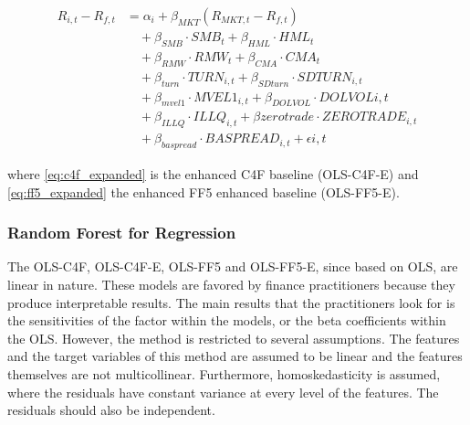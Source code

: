 \begin{equation}
    \label{eq:ff5_expanded}
    \begin{split}
    R_{i,t} - R_{f,t} &= \alpha_i + \beta_{MKT} (R_{MKT,t} - R_{f,t}) \\
    &\quad + \beta_{SMB} \cdot SMB_t + \beta_{HML} \cdot HML_t \\
    &\quad + \beta_{RMW} \cdot RMW_t + \beta_{CMA} \cdot CMA_t\\
    &\quad + \beta_{turn} \cdot TURN_{i,t} + \beta_{SDturn} \cdot SDTURN_{i,t} \\
    &\quad + \beta_{mvel1} \cdot MVEL1_{i,t} + \beta_{DOLVOL} \cdot DOLVOL{i,t} \\
    &\quad + \beta_{ILLQ} \cdot ILLQ_{i,t} + \beta{zerotrade} \cdot ZEROTRADE_{i,t} \\
    &\quad + \beta_{baspread} \cdot BASPREAD_{i,t} + \epsilon{i,t}
    \end{split}
\end{equation}

where \cref{eq:c4f_expanded} is the enhanced C4F baseline (OLS-C4F-E) and \cref{eq:ff5_expanded} the enhanced FF5 enhanced baseline (OLS-FF5-E).



\subsubsection{Random Forest for Regression}



The OLS-C4F, OLS-C4F-E, OLS-FF5 and OLS-FF5-E, since based on OLS, are linear in nature. These models are favored by finance practitioners because they produce interpretable results. The main results that the practitioners look for is the sensitivities of the factor within the models, or the beta coefficients within the OLS. However, the method is restricted to several assumptions. The features and the target variables of this method are assumed to be linear and the features themselves are not multicollinear. Furthermore, homoskedasticity is assumed, where the residuals have constant variance at every level of the features. The residuals should also be independent.

